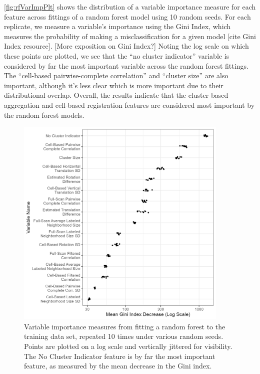 \documentclass[
]{jdssv}
\begin{document}
\autoref{fig:rfVarImpPlt} shows the distribution of a variable
importance measure for each feature across fittings of a random forest
model using 10 random seeds. For each replicate, we measure a variable's
importance using the Gini Index, which measures the probability of
making a misclassification for a given model {[}cite Gini Index
resource{]}. {[}More exposition on Gini Index?{]} Noting the log scale
on which these points are plotted, we see that the ``no cluster
indicator'' variable is considered by far the most important variable
across the random forest fittings. The ``cell-based pairwise-complete
correlation'' and ``cluster size'' are also important, although it's
less clear which is more important due to their distributional overlap.
Overall, the results indicate that the cluster-based aggregation and
cell-based registration features are considered most important by the
random forest models.

\begin{CodeChunk}
\begin{figure}[htbp]

{\centering \includegraphics[width=4in,height=4in]{figures/varImportanceBoxplot} 

}

\caption{\label{fig:rfVarImpPlt} Variable importance measures from fitting a random forest to the training data set, repeated 10 times under various random seeds. Points are plotted on a log scale and vertically jittered for visibility. The No Cluster Indicator feature is by far the most important feature, as measured by the mean decrease in the Gini index.}\label{fig:unnamed-chunk-28}
\end{figure}
\end{CodeChunk}
\end{document}
